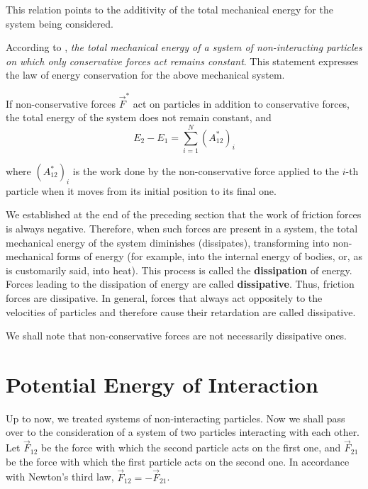 \noindent
This relation points to the additivity of the total mechanical energy for the system being considered.

According to , \textit{the total mechanical energy of a system of non-interacting particles on which only conservative forces act remains constant}. This statement expresses the law of energy conservation for the above mechanical system.

If non-conservative forces $\vec{F}^*$ act on particles in addition to conservative forces, the total energy of the system does not remain constant, and
\begin{equation}\label{eq:3_40}
E_2 - E_1 = \sum_{i=1}^{N}(A_{12}^*)_i
\end{equation}

\noindent
where $(A_{12}^*)_i$ is the work done by the non-conservative force applied to the $i$-th particle when it moves from its initial position to its final one.

We established at the end of the preceding section that the work of friction forces is always negative. Therefore, when such forces are present in a system, the total mechanical energy of the system diminishes (dissipates), transforming into non-mechanical forms of energy (for example, into the internal energy of bodies, or, as is customarily said, into heat). This process is called the \textbf{dissipation} of energy. Forces leading to the dissipation of energy are called \textbf{dissipative}. Thus, friction forces are dissipative. In general, forces that always act oppositely to the velocities of particles and therefore cause their retardation are called dissipative.

We shall note that non-conservative forces are not necessarily dissipative ones.

\section{Potential Energy of Interaction}\label{sec:3_6}

Up to now, we treated systems of non-interacting particles. Now we shall pass over to the consideration of a system of two particles interacting with each other. Let $\vec{F}_{12}$ be the force with which the second particle acts on the first one, and $\vec{F}_{21}$ be the force with which the first particle acts on the second one. In accordance with Newton's third law, $\vec{F}_{12}=-\vec{F}_{21}$.


